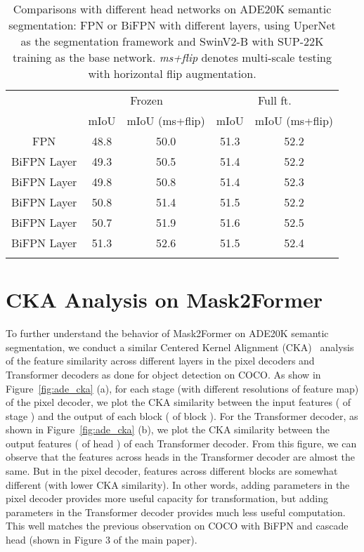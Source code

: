 \documentclass{article}
\begin{document}
\begin{table}[h]
        \centering
        \addtolength{\tabcolsep}{3.0pt}
        \begin{tabular}{c|cc|cc}
            \Xhline{1.0pt}
            \multirow{2}{*}{Head Network} & \multicolumn{2}{c|}{Frozen} & \multicolumn{2}{c}{Full ft.} \\
             & mIoU & mIoU (ms+flip) & mIoU & mIoU (ms+flip) \\
            \hline
            FPN & 48.8 & 50.0 & 51.3 & 52.2 \\
             BiFPN Layer & 49.3 & 50.5 & 51.4 & 52.2  \\
             BiFPN Layer & 49.8 & 50.8 & 51.4 & 52.3 \\
             BiFPN Layer & 50.8 & 51.4 & 51.5 & 52.2 \\
             BiFPN Layer & 50.7 & 51.9 & 51.6 & 52.5 \\
             BiFPN Layer & 51.3 & 52.6 & 51.5 & 52.4 \\
          \Xhline{1.0pt}  
       \end{tabular}
       \caption{Comparisons with different head networks on ADE20K semantic segmentation: FPN or BiFPN with different layers, using UperNet as the segmentation framework and SwinV2-B with SUP-22K training as the base network. \emph{ms+flip} denotes multi-scale testing with horizontal flip augmentation.}
    \label{tab:upernet_param_at_head_ade}
\end{table}

\section{CKA Analysis on Mask2Former}
To further understand the behavior of Mask2Former on ADE20K semantic segmentation, we conduct a similar Centered Kernel Alignment (CKA)~\cite{cka} analysis of the feature similarity across different layers in the pixel decoders and Transformer decoders as done for object detection on COCO. As show in Figure~\ref{fig:ade_cka} (a), for each stage (with different resolutions of feature map) of the pixel decoder, we plot the CKA similarity between the input features ( of stage ) and the output of each block ( of block ). For the Transformer decoder, as shown in Figure~\ref{fig:ade_cka} (b), we plot the CKA similarity between the output features ( of head ) of each Transformer decoder. 
From this figure, we can observe that the features across heads in the Transformer decoder are almost the same. But in the pixel decoder, features across different blocks are somewhat different (with lower CKA similarity). In other words, adding parameters in the pixel decoder provides more useful capacity for transformation, but adding parameters in the Transformer decoder provides much less useful computation. This well matches the previous observation on COCO with BiFPN and cascade head (shown in Figure 3 of the main paper).
\end{document}
